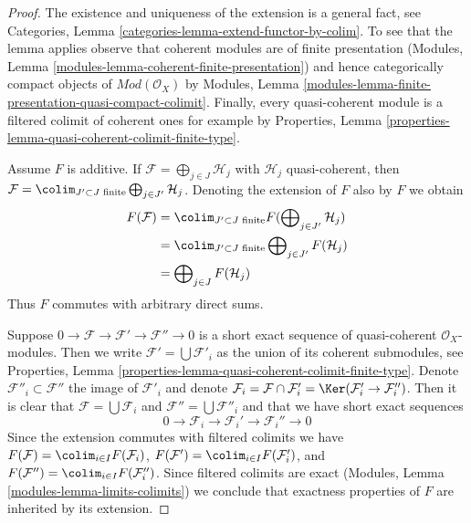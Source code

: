 \begin{proof}
The existence and uniqueness of the extension is a general fact, see
Categories, Lemma \ref{categories-lemma-extend-functor-by-colim}.
To see that the lemma applies observe that coherent modules
are of finite presentation
(Modules, Lemma \ref{modules-lemma-coherent-finite-presentation}) and hence
categorically compact objects of $\textit{Mod}(\mathcal{O}_X)$ by
Modules, Lemma \ref{modules-lemma-finite-presentation-quasi-compact-colimit}.
Finally, every quasi-coherent module is a filtered colimit
of coherent ones for example by
Properties, Lemma \ref{properties-lemma-quasi-coherent-colimit-finite-type}.

\medskip\noindent
Assume $F$ is additive. If $\mathcal{F} = \bigoplus_{j \in J} \mathcal{H}_j$
with $\mathcal{H}_j$ quasi-coherent, then
$\mathcal{F} = \colim_{J' \subset J\text{ finite}}
\bigoplus_{j \in J'} \mathcal{H}_j$.
Denoting the extension of $F$ also by $F$ we obtain
\begin{align*}
F(\mathcal{F})
& =
\colim_{J' \subset J\text{ finite}}
F(\bigoplus\nolimits_{j \in J'} \mathcal{H}_j) \\
& =
\colim_{J' \subset J\text{ finite}}
\bigoplus\nolimits_{j \in J'} F(\mathcal{H}_j) \\
& =
\bigoplus\nolimits_{j \in J} F(\mathcal{H}_j)
\end{align*}
Thus $F$ commutes with arbitrary direct sums.

\medskip\noindent
Suppose $0 \to \mathcal{F} \to \mathcal{F}' \to \mathcal{F}'' \to 0$
is a short exact sequence of quasi-coherent $\mathcal{O}_X$-modules.
Then we write $\mathcal{F}' = \bigcup \mathcal{F}'_i$ as the
union of its coherent submodules, see
Properties, Lemma \ref{properties-lemma-quasi-coherent-colimit-finite-type}.
Denote $\mathcal{F}''_i \subset \mathcal{F}''$ the image of $\mathcal{F}'_i$
and denote $\mathcal{F}_i = \mathcal{F} \cap \mathcal{F}'_i =
\Ker(\mathcal{F}'_i \to \mathcal{F}''_i)$. Then it is clear that
$\mathcal{F} = \bigcup \mathcal{F}_i$ and
$\mathcal{F}'' = \bigcup \mathcal{F}''_i$
and that we have short exact sequences
$$
0 \to \mathcal{F}_i \to \mathcal{F}_i' \to \mathcal{F}_i'' \to 0
$$
Since the extension commutes with filtered colimits we have
$F(\mathcal{F}) = \colim_{i \in I} F(\mathcal{F}_i)$,
$F(\mathcal{F}') = \colim_{i \in I} F(\mathcal{F}'_i)$, and
$F(\mathcal{F}'') = \colim_{i \in I} F(\mathcal{F}''_i)$.
Since filtered colimits are exact
(Modules, Lemma \ref{modules-lemma-limits-colimits}) we
conclude that exactness properties of $F$ are inherited by
its extension.
\end{proof}

